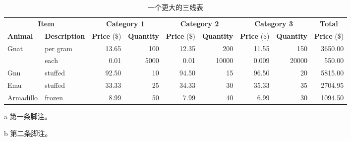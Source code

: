 \begin{table}[!htb]
  \centering
  \begin{threeparttable}[b]
    \caption{一个更大的三线表}
    \label{tab:bigtable}
    \setlength{\tabcolsep}{4pt} %
    \begin{tabular*}{\linewidth}{@{\extracolsep{\fill}}llrrrrrrr} \toprule
      \multicolumn{2}{c}{\textbf{Item}} & \multicolumn{2}{c}{\textbf{Category 1}} & \multicolumn{2}{c}{\textbf{Category 2}} & \multicolumn{2}{c}{\textbf{Category 3}} & \multicolumn{1}{c}{\textbf{Total}}                                                                                     \\ \cmidrule(r){1-2} \cmidrule(lr){3-4} \cmidrule(lr){5-6} \cmidrule(lr){7-8} \cmidrule(l){9-9}
      \textbf{Animal}                   & \textbf{Description}                    & \textbf{Price} (\$)                     & \textbf{Quantity}                       & \textbf{Price} (\$)                & \textbf{Quantity} & \textbf{Price} (\$) & \textbf{Quantity} & \textbf{Price} (\$) \\ \midrule
      Gnat                              & per gram\tnote{a}                       & 13.65                                   & 100                                     & 12.35                              & 200               & 11.55               & 150               & 3650.00             \\
                                        & each                                    & 0.01                                    & 5000                                    & 0.01                               & 10000             & 0.009               & 20000             & 550.00              \\
      Gnu                               & stuffed                                 & 92.50                                   & 10                                      & 94.50                              & 15                & 96.50               & 20                & 5815.00             \\
      Emu                               & stuffed                                 & 33.33                                   & 25                                      & 34.33                              & 30                & 35.33               & 35                & 2704.95             \\
      Armadillo                         & frozen                                  & 8.99                                    & 50                                      & 7.99                               & 40                & 6.99                & 30\tnote{b}       & 1094.50             \\ \bottomrule
    \end{tabular*}
    \begin{tablenotes}
      \item [a] 第一条脚注。
      \item [b] 第二条脚注。
    \end{tablenotes}
  \end{threeparttable}
\end{table}

